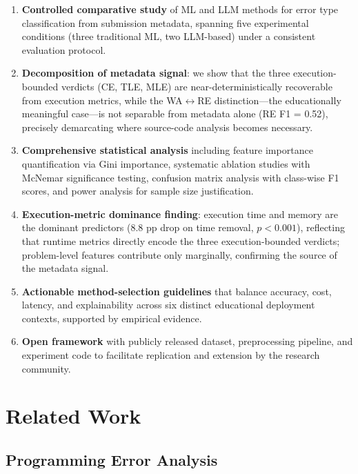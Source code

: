 \documentclass[acmsmall]{acmart}
\begin{document}
\begin{enumerate}
 \item \textbf{Controlled comparative study} of ML and LLM methods for error
 type classification from submission metadata, spanning five
 experimental conditions (three traditional ML, two LLM-based) under a
 consistent evaluation protocol.
 \item \textbf{Decomposition of metadata signal}: we show that the three
 execution-bounded verdicts (CE, TLE, MLE) are near-deterministically
 recoverable from execution metrics, while the WA$\leftrightarrow$RE
 distinction---the educationally meaningful case---is not separable
 from metadata alone (RE F1 = 0.52), precisely demarcating where
 source-code analysis becomes necessary.
 \item \textbf{Comprehensive statistical analysis} including feature
 importance quantification via Gini importance, systematic ablation
 studies with McNemar significance testing, confusion matrix analysis
 with class-wise F1 scores, and power analysis for sample size
 justification.
 \item \textbf{Execution-metric dominance finding}: execution time and memory
 are the dominant predictors (8.8 pp drop on time removal, $p < 0.001$),
 reflecting that runtime metrics directly encode the three
 execution-bounded verdicts; problem-level features contribute only
 marginally, confirming the source of the metadata signal.
 \item \textbf{Actionable method-selection guidelines} that balance
 accuracy, cost, latency, and explainability across six distinct
 educational deployment contexts, supported by empirical evidence.
 \item \textbf{Open framework} with publicly released dataset, preprocessing
 pipeline, and experiment code to facilitate replication and
 extension by the research community.
\end{enumerate}

\section{Related Work}

\subsection{Programming Error Analysis}
\end{document}
